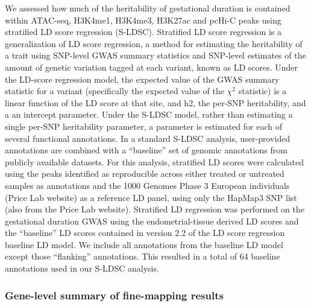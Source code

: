 We assessed how much of the heritability of  gestational duration is contained within ATAC-seq, H3K4me1, H3K4me3, H3K27ac and pcHi-C peaks using stratified LD score regression (S-LDSC).
Stratified LD score regression is a generalization of LD score regression, a method for estimating the heritability of a trait using SNP-level GWAS summary statistics and SNP-level estimates
 of the amount of genetic variation tagged at each variant, known as LD scores.  Under the LD-score regression model, the expected value of the GWAS summary statistic for a variant (specifically 
the expected value of the \(\chi^2\) statistic) is a linear function of the LD score at that site, and h2, the per-SNP heritability, and a an intercept parameter.  Under the S-LDSC model, rather than estimating a 
single per-SNP heritability parameter, a parameter is estimated for each of several functional annotations.  In a standard S-LDSC analysis, user-provided annotations are combined with a ``baseline'' set of genomic
 annotations from publicly available datasets.  For this analysis, stratified LD scores were calculated using the peaks identified as reproducible across either treated or untreated samples as annotations and the 
1000 Genomes Phase 3 European individuals (Price Lab website) as a reference LD panel, using only the HapMap3 SNP list (also from the Price Lab website). Stratified LD regression was performed on the gestational 
duration GWAS using the endometrial-tissue derived LD scores and the “baseline” LD scores contained in version 2.2 of the LD score regression baseline LD model. We include all annotations from the baseline LD model 
except those “flanking” annotations. This resulted in a total of 64 baseline annotations used in our S-LDSC analysis.  


\subsubsection{Gene-level summary of fine-mapping results}\label{sec:org3f48450}

